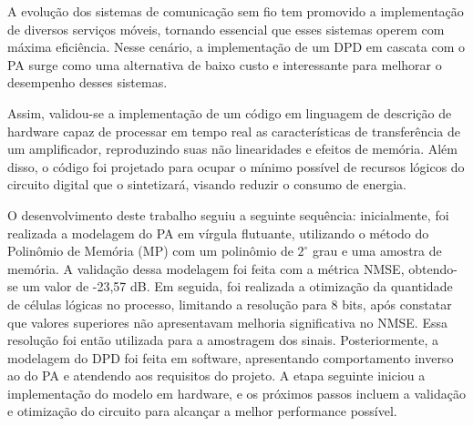 A evolução dos sistemas de comunicação sem fio tem promovido a implementação de diversos serviços móveis, tornando essencial que esses sistemas operem com máxima eficiência. Nesse cenário, a implementação de um DPD em cascata com o PA surge como uma alternativa de baixo custo e interessante para melhorar o desempenho desses sistemas.

Assim, validou-se a implementação de um código em linguagem de descrição de hardware capaz de processar em tempo real as características de transferência de um amplificador, reproduzindo suas não linearidades e efeitos de memória. Além disso, o código foi projetado para ocupar o mínimo possível de recursos lógicos do circuito digital que o sintetizará, visando reduzir o consumo de energia.

O desenvolvimento deste trabalho seguiu a seguinte sequência: inicialmente, foi realizada a modelagem do PA em vírgula flutuante, utilizando o método do Polinômio de Memória (MP) com um polinômio de $2^\circ$ grau e uma amostra de memória. A validação dessa modelagem foi feita com a métrica NMSE, obtendo-se um valor de -23,57 dB. Em seguida, foi realizada a otimização da quantidade de células lógicas no processo, limitando a resolução para 8 bits, após constatar que valores superiores não apresentavam melhoria significativa no NMSE. Essa resolução foi então utilizada para a amostragem dos sinais. Posteriormente, a modelagem do DPD foi feita em software, apresentando comportamento inverso ao do PA e atendendo aos requisitos do projeto. A etapa seguinte iniciou a implementação do modelo em hardware, e os próximos passos incluem a validação e otimização do circuito para alcançar a melhor performance possível.